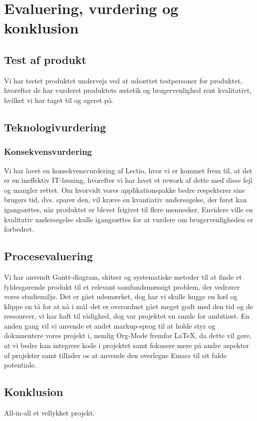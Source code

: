 \section{Evaluering, vurdering og konklusion \label{sec:konklusion}}
\subsection{Test af produkt}
Vi har testet produktet undervejs ved at udsættet testpersoner for produktet, hvorefter de har vurderet produktets æstetik og brugervenlighed rent kvalitativt, 
hvilket vi har taget til og ageret på.
\subsection{Teknologivurdering}
\subsubsection{Konsekvensvurdering}
Vi har lavet en konsekvensvurdering af Lectio, hvor vi er kommet frem til, at det er en ineffektiv IT-løsning, hvorefter vi har lavet et rework af dette med disse fejl og mangler rettet. 
Om hvorvidt vores applikationspakke bedre respekterer sine brugers tid, dvs. sparer den, vil kræve en kvantiativ undersøgelse, der først kan igangsættes, når produktet er blevet frigivet til flere mennesker. 
Envidere ville en kvalitativ undersøgelse skulle igangsættes for at vurdere om brugervenligheden er forbedret.
\subsection{Procesevaluering}
Vi har anvendt Gantt-diagram, skitser og systematiske metoder til at finde et fyldesgørende produkt til et relevant samfundsmæssigt problem, der vedrører vores studiemiljø. 
Det er gået udemærket, dog har vi skulle hugge en hæl og klippe en tå for at nå i mål--det er overordnet gået meget godt med den tid og de ressourcer, vi har haft til rådighed, dog var projektet en smule for ambitiøst. 
En anden gang vil vi anvende et andet markup-sprog til at holde styr og dokumentere vores projekt i, nemlig Org-Mode fremfor \LaTeX, da dette vil gøre, at vi bedre kan integrere kode i projektet samt fokusere mere på 
andre aspekter af projekter samt tillader os at anvende den overlegne Emacs til sit fulde potentiale.

\subsection{Konklusion}
All-in-all et vellykket projekt.
